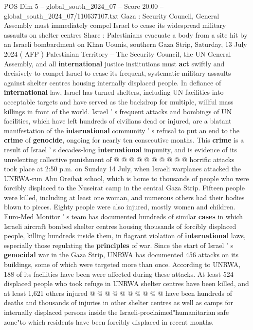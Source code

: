 \begin{textsample}{POS Dim 5 – global\_south\_2024\_07 – Score 20.00 – global\_south\_2024\_07/110637107.txt}  \label{ex:f5_pos_171}
Gaza : Security Council, General Assembly must immediately compel Israel to cease its widespread military assaults on shelter centres Share : Palestinians evacuate a body from a site hit by an Israeli bombardment on Khan Uounis, southern Gaza Strip, Saturday, 13 July 2024 ( AFP ) Palestinian Territory -- The Security Council, the UN General Assembly, and all \textbf{international} justice institutions must \textbf{act} swiftly and decisively to compel Israel to cease its frequent, systematic military assaults against shelter centres housing internally displaced people.
In defiance of \textbf{international} law, Israel has turned shelters, including UN facilities into acceptable targets and have served as the backdrop for multiple, willful mass killings in front of the world.
Israel ' s frequent attacks and bombings of UN facilities, which have left hundreds of civilians dead or injured, are a blatant manifestation of the \textbf{international} community ' s refusal to put an end to the \textbf{crime} of \textbf{genocide}, ongoing for nearly ten consecutive months.
This \textbf{crime} is a result of Israel ' s decades-long \textbf{international} impunity, and is evidence of its unrelenting collective punishment of @ @ @ @ @ @ @ @ @ @ horrific attacks took place at 2:50 p.m. on Sunday 14 July, when Israeli warplanes attacked the UNRWA-run Abu Oreibat school, which is home to thousands of people who were forcibly displaced to the Nuseirat camp in the central Gaza Strip.
Fifteen people were killed, including at least one woman, and numerous others had their bodies blown to pieces.
Eighty people were also injured, mostly women and children.
Euro-Med Monitor ' s team has documented hundreds of similar \textbf{cases} in which Israeli aircraft bombed shelter centres housing thousands of forcibly displaced people, killing hundreds inside them, in flagrant violation of \textbf{international} laws, especially those regulating the \textbf{principles} of war.
Since the start of Israel ' s \textbf{genocidal} war in the Gaza Strip, UNRWA has documented 456 attacks on its buildings, some of which were targeted more than once.
According to UNRWA, 188 of its facilities have been were affected during these attacks.
At least 524 displaced people who took refuge in UNRWA shelter centres have been killed, and at least 1,621 others injured @ @ @ @ @ @ @ @ @ @ have been hundreds of deaths and thousands of injuries in other shelter centres as well as camps for internally displaced persons inside the Israeli-proclaimed"humanitarian safe zone"to which residents have been forcibly displaced in recent months.

\end{textsample}
